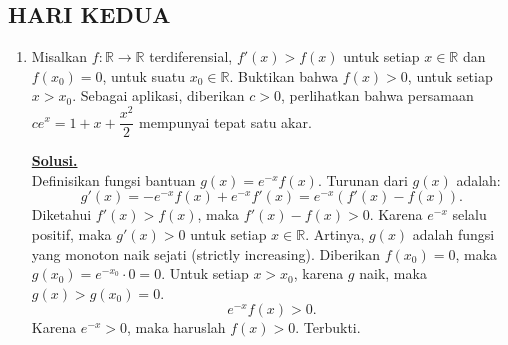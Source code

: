 \documentclass[12pt,twoside]{article}
\newenvironment{solution}
{
	\par\noindent\textbf{\underline{Solusi.}}\\
}
{
	\par
}
\begin{document}
\subsection{HARI KEDUA}
\begin{enumerate}
  \item Misalkan $f:\mathbb{R}\to\mathbb{R}$ terdiferensial, $f'(x)>f(x) $ untuk setiap $x\in\mathbb{R}$ dan $f(x_0)=0$, untuk suatu $x_0\in\mathbb{R}$. Buktikan bahwa $f(x)>0$, untuk setiap $x>x_0$. Sebagai aplikasi, diberikan $c>0$, perlihatkan bahwa persamaan $ce^x=1+x+\dfrac{x^2}{2}$ mempunyai tepat satu akar.
        \begin{solution}
          Definisikan fungsi bantuan $g(x) = e^{-x} f(x)$.
          Turunan dari $g(x)$ adalah:
          $$ g'(x) = -e^{-x}f(x) + e^{-x}f'(x) = e^{-x}(f'(x) - f(x)). $$
          Diketahui $f'(x) > f(x)$, maka $f'(x) - f(x) > 0$. Karena $e^{-x}$ selalu positif, maka $g'(x) > 0$ untuk setiap $x \in \mathbb{R}$.
          Artinya, $g(x)$ adalah fungsi yang monoton naik sejati (strictly increasing).
          Diberikan $f(x_0) = 0$, maka $g(x_0) = e^{-x_0} \cdot 0 = 0$.
          Untuk setiap $x > x_0$, karena $g$ naik, maka $g(x) > g(x_0) = 0$.
          $$ e^{-x} f(x) > 0. $$
          Karena $e^{-x} > 0$, maka haruslah $f(x) > 0$. Terbukti.


\end{solution}
\end{enumerate}
\end{document}
